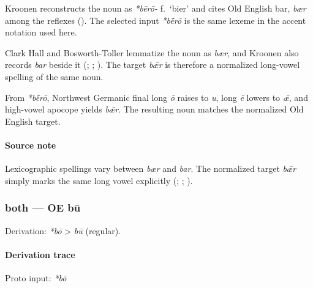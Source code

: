 \documentclass[
  british,
  a4paper,
]{article}
\begin{document}
Kroonen reconstructs the noun as \emph{*bērō-} f.~`bier' and cites Old
English bar, \emph{bær} among the reflexes
(). The selected input
\emph{*bḗrō} is the same lexeme in the accent notation used here.

Clark Hall and Bosworth-Toller lemmatize the noun as \emph{bær}, and
Kroonen also records \emph{bar} beside it
(;
;
). The target \emph{bǣr} is
therefore a normalized long-vowel spelling of the same noun.

From \emph{*bḗrō}, Northwest Germanic final long \emph{ō} raises to
\emph{u}, long \emph{ē} lowers to \emph{ǣ}, and high-vowel apocope
yields \emph{bǣr}. The resulting noun matches the normalized Old English
target.

\paragraph{Source note}\label{source-note-1}

Lexicographic spellings vary between \emph{bær} and \emph{bar}. The
normalized target \emph{bǣr} simply marks the same long vowel explicitly
(;
;
).

\subsubsection{both --- OE bū}\label{both-oe-bux16b-1}

Derivation: \emph{*bō} \textgreater{} \emph{bū} (regular).

\paragraph{Derivation trace}\label{derivation-trace-15}

Proto input: \emph{*bō}

\begingroup
\setlength{\fboxsep}{6pt}
\end{document}
